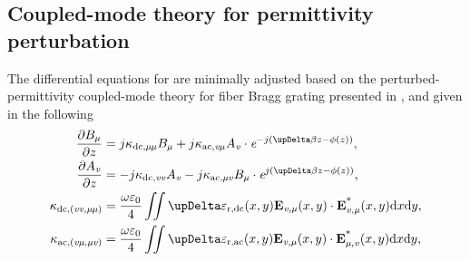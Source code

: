 \subsection{Coupled-mode theory for permittivity perturbation} \label{sec:2.3.1}
    The differential equations for  are minimally adjusted 
    based on the perturbed-permittivity coupled-mode theory for fiber Bragg grating presented in \cite{kashyap-fbg}, 
    and given in the following
    \begin{align}
        \frac{\partial B_\text{\textit{\textmu}}}{\partial z} &= j\kappa_\text{dc,\textit{\textmu \textmu}}B_\text{\textit{\textmu}} + 
                j\kappa_\text{ac,\textit{v\textmu}}A_\text{\textit{v}}\cdot \textit{e}^{-j(\upDelta \beta z - \phi (z))}\text{,}\label{eqCMT:1} \\
        \frac{\partial A_\text{\textit{v}}}{\partial z} &= -j\kappa_\text{dc,\ur{\textit{vv}}}A_\text{\textit{v}} - 
                j\kappa_\text{ac,\textit{\textmu v}}B_\text{\textit{\textmu}}
                \cdot \textit{e}^{j(\upDelta \beta z - \phi (z))}\text{,}\label{eqCMT:2}\\
        \kappa_\text{dc,(\textit{vv,\textmu \textmu})} &= \frac{\omega \varepsilon_0}{4} \iint \upDelta \varepsilon_\text{r,dc} (x,y)
            \textbf{E}_\text{\textit{v,\textmu}}(x,y)
            \cdot \textbf{E}_\text{\textit{v,\textmu}}^\text{*}(x,y)\text{d}x\text{d}y\text{,}\label{eqCMT:3} \\
        \kappa_\text{ac,(\textit{v\textmu,\textmu v})} &= \frac{\omega \varepsilon_0}{4} \iint \upDelta \varepsilon_\text{r,ac} (x,y)
            \textbf{E}_\text{\textit{v,\textmu}}(x,y)
            \cdot \textbf{E}_\text{\textit{\textmu ,v}}^\text{*}(x,y)\text{d}x\text{d}y\text{,}\label{eqCMT:4}
    \end{align}
    \lipsum
    
